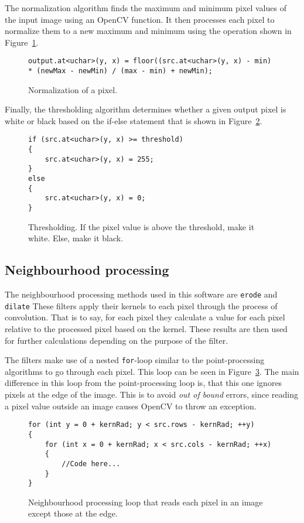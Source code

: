 The normalization algorithm finds the maximum and minimum pixel values of the input image using an OpenCV function. It then processes each pixel to normalize them to a new maximum and minimum using the operation shown in Figure~\ref{fig:normalize}.

\begin{figure}
\begin{lstlisting}
output.at<uchar>(y, x) = floor((src.at<uchar>(y, x) - min) * (newMax - newMin) / (max - min) + newMin);
\end{lstlisting}
\caption{Normalization of a pixel. \label{fig:normalize}}
\end{figure} 

Finally, the thresholding algorithm determines whether a given output pixel is white or black based on the if-else statement that is shown in Figure~\ref{fig:threshold}.

\begin{figure}
\begin{lstlisting}
if (src.at<uchar>(y, x) >= threshold)
{
	src.at<uchar>(y, x) = 255;
}
else
{
	src.at<uchar>(y, x) = 0;
}
\end{lstlisting}
\caption{Thresholding. If the pixel value is above the threshold, make it white. Else, make it black.\label{fig:threshold}}
\end{figure}

\subsection{Neighbourhood processing}
The neighbourhood processing methods used in this software are \texttt{erode} and \texttt{dilate} These filters apply their kernels to each pixel through the process of convolution. That is to say, for each pixel they calculate a value for each pixel relative to the processed pixel based on the kernel. These results are then used for further calculations depending on the purpose of the filter.

The filters make use of a nested \texttt{for}-loop similar to the point-processing algorithms to go through each pixel. This loop can be seen in Figure~\ref{fig:neighbourhoodForLoop}. The main difference in this loop from the point-processing loop is, that this one ignores pixels at the edge of the image. This is to avoid \textit{out of bound} errors, since reading a pixel value outside an image causes OpenCV to throw an exception.

\begin{figure}
\begin{lstlisting}
for (int y = 0 + kernRad; y < src.rows - kernRad; ++y)
{
	for (int x = 0 + kernRad; x < src.cols - kernRad; ++x)
	{
		//Code here...
	}
}
\end{lstlisting}
\caption{Neighbourhood processing loop that reads each pixel in an image except those at the edge. \label{fig:neighbourhoodForLoop}}
\end{figure}

